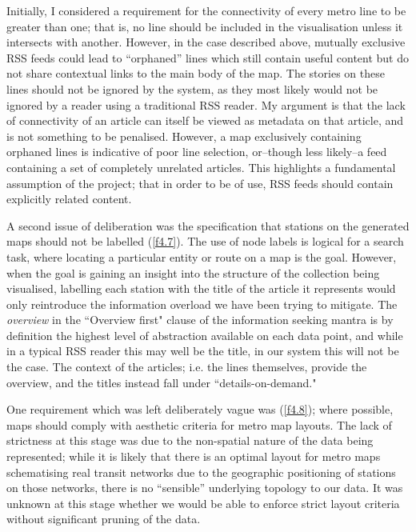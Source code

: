 Initially, I considered a requirement for the connectivity \citep{GeneratingInformationMaps} of every metro line to be greater than one; that is, no line should be included in the visualisation unless it intersects with another. However, in the case described above, mutually exclusive RSS feeds could lead to ``orphaned'' lines which still contain useful content but do not share contextual links to the main body of the map. The stories on these lines should not be ignored by the system, as they most likely would not be ignored by a reader using a traditional RSS reader. My argument is that the lack of connectivity of an article can itself be viewed as metadata on that article, and is not something to be penalised. However, a map exclusively containing orphaned lines is indicative of poor line selection, or--though less likely--a feed containing a set of completely unrelated articles. This highlights a fundamental assumption of the project; that in order to be of use, RSS feeds should contain explicitly related content.

A second issue of deliberation was the specification that stations on the generated maps should not be labelled (\ref{f4.7}). The use of node labels is logical for a search task, where locating a particular entity or route on a map is the goal. However, when the goal is gaining an insight into the structure of the collection being visualised, labelling each station with the title of the article it represents would only reintroduce the information overload we have been trying to mitigate. The \textit{overview} in the ``Overview first" clause of the information seeking mantra \citep{TheEyesHaveIt} is by definition the highest level of abstraction available on each data point, and while in a typical RSS reader this may well be the title, in our system this will not be the case. The context of the articles; i.e. the lines themselves, provide the overview, and the titles instead fall under ``details-on-demand."

One requirement which was left deliberately vague was (\ref{f4.8}); where possible, maps should comply with  aesthetic criteria for metro map layouts. The lack of strictness at this stage was due to the non-spatial nature of the data being represented; while it is likely that there is an optimal layout for metro maps schematising real transit networks due to the geographic positioning of stations on those networks, there is no ``sensible'' underlying topology to our data. It was unknown at this stage whether we would be able to enforce strict layout criteria without significant pruning of the data.





